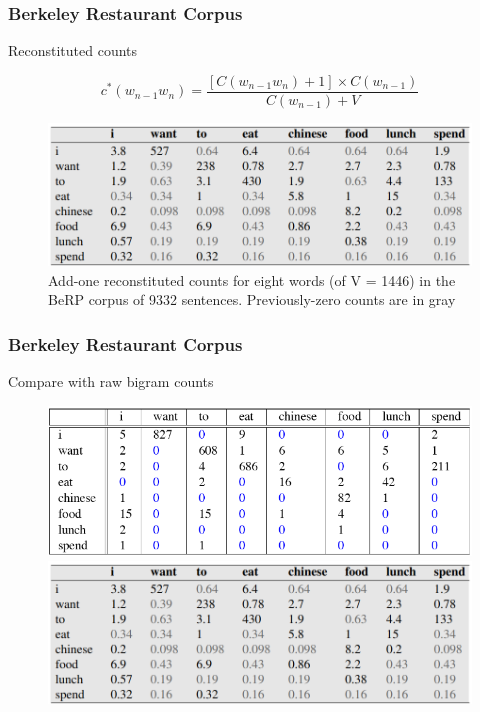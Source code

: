 \documentclass[13.5pt,aspecratio=169]{beamer}
\begin{document}
\begin{frame}
    \onehalfspacing
        \frametitle{Berkeley Restaurant Corpus}
        {\Large Reconstituted counts} \vspace{-2em}
        \begin{center} 
            \[ c^*(w_{n-1} w_{n}) = \frac{[ C(w_{n-1} w_n) + 1] \times C(w_{n-1})} {C(w_{n-1}) + V} \]
          \end{center}
        
            \begin{figure}
                \centering
                \includegraphics [scale=0.5] {add_one_reconsituted_counts.png}
                \caption{Add-one reconstituted counts for eight words (of V = 1446) in the BeRP corpus
                of 9332 sentences. Previously-zero counts are in gray}
            \end{figure}
    \end{frame}
\begin{frame}
\onehalfspacing
	\frametitle{Berkeley Restaurant Corpus}
    \begin{minipage}{0.5\textwidth}
        \begin{block}{}
            Compare with raw bigram counts
        \end{block}
    \end{minipage}

	\begin{figure}[h]
        \centering
        \includegraphics [scale=0.45] {raw_bigram_counts.png}
        \includegraphics [scale=0.45] {add_one_reconsituted_counts.png}
    \end{figure}
\end{frame}
\end{document}

